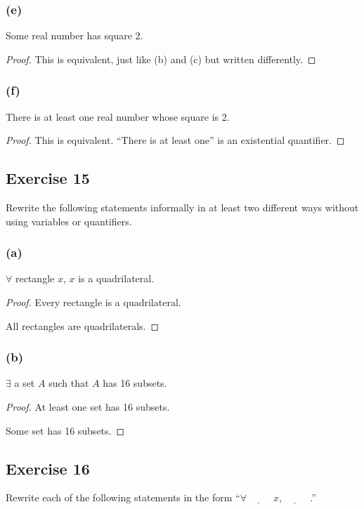 \documentclass[14pt]{extarticle}
\newcommand{\fbl}{\underline{\hspace{1cm}}\,\,}
\newcommand{\fa}{\forall}
\newcommand{\te}{\exists}
\begin{document}
\subsubsection{(e)}
Some real number has square 2.

\begin{proof}
    This is equivalent, just like (b) and (c) but written differently.
\end{proof}

\subsubsection{(f)}
There is at least one real number whose square is 2.

\begin{proof}
    This is equivalent. ``There is at least one'' is an existential quantifier.
\end{proof}

\subsection{Exercise 15}
Rewrite the following statements informally in at least two different ways without using variables or quantifiers.

\subsubsection{(a)}
$\fa$ rectangle $x$, $x$ is a quadrilateral.

\begin{proof}
    Every rectangle is a quadrilateral.

    All rectangles are quadrilaterals.
\end{proof}

\subsubsection{(b)}
$\te$ a set $A$ such that $A$ has 16 subsets.

\begin{proof}
    At least one set has 16 subsets.

    Some set has 16 subsets.
\end{proof}

\subsection{Exercise 16}
Rewrite each of the following statements in the form “$\fa \fbl x, \fbl$.”
\end{document}
